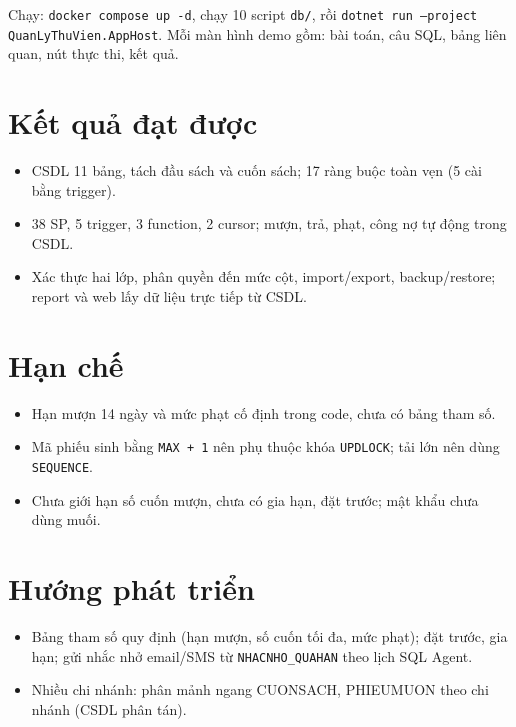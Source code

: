 \documentclass[a4paper,oneside]{report}
\begin{document}
Chạy: \texttt{docker compose up -d}, chạy 10 script \texttt{db/}, rồi \texttt{dotnet run --project QuanLyThuVien.AppHost}. Mỗi màn hình demo gồm: bài toán, câu SQL, bảng liên quan, nút thực thi, kết quả.

\section{Kết quả đạt được}
\begin{itemize}
\item CSDL 11 bảng, tách đầu sách và cuốn sách; 17 ràng buộc toàn vẹn (5 cài bằng trigger).
\item 38 SP, 5 trigger, 3 function, 2 cursor; mượn, trả, phạt, công nợ tự động trong CSDL.
\item Xác thực hai lớp, phân quyền đến mức cột, import/export, backup/restore; report và web lấy dữ liệu trực tiếp từ CSDL.
\end{itemize}

\section{Hạn chế}
\begin{itemize}
\item Hạn mượn 14 ngày và mức phạt cố định trong code, chưa có bảng tham số.
\item Mã phiếu sinh bằng \texttt{MAX + 1} nên phụ thuộc khóa \texttt{UPDLOCK}; tải lớn nên dùng \texttt{SEQUENCE}.
\item Chưa giới hạn số cuốn mượn, chưa có gia hạn, đặt trước; mật khẩu chưa dùng muối.
\end{itemize}

\section{Hướng phát triển}
\begin{itemize}
\item Bảng tham số quy định (hạn mượn, số cuốn tối đa, mức phạt); đặt trước, gia hạn; gửi nhắc nhở email/SMS từ \texttt{NHACNHO\_QUAHAN} theo lịch SQL Agent.
\item Nhiều chi nhánh: phân mảnh ngang CUONSACH, PHIEUMUON theo chi nhánh (CSDL phân tán).
\end{itemize}

\end{document}
